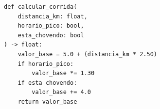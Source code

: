 \ifmostrarGabarito
\begin{verbatim}
def calcular_corrida(
    distancia_km: float,
    horario_pico: bool,
    esta_chovendo: bool
) -> float:
    valor_base = 5.0 + (distancia_km * 2.50)
    if horario_pico:
        valor_base *= 1.30
    if esta_chovendo:
        valor_base += 4.0
    return valor_base
\end{verbatim}

\fi
